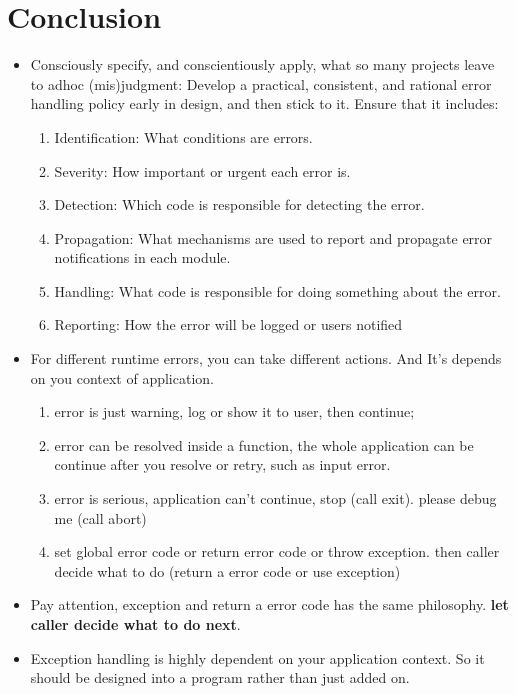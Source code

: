 \documentclass[a4paper,11pt,twoside]{book}
\begin{document}
\section{Conclusion}
\begin{itemize}
	\item  Consciously specify, and conscientiously apply, what so many projects leave to adhoc
	(mis)judgment: Develop a practical, consistent, and rational error handling
	policy early in design, and then stick to it. Ensure that it includes:
	
	\begin{enumerate}
		\item Identification: What conditions are errors.
		\item Severity: How important or urgent each error is.
		\item Detection: Which code is responsible for detecting the error.
		\item Propagation: What mechanisms are used to report and propagate error
		notifications in each module.
		\item Handling: What code is responsible for doing something about the error.
		\item Reporting: How the error will be logged or users notified
	\end{enumerate}
	
	
	\item For different runtime errors, you can take different actions. And It's depends on you context of application.
	\begin{enumerate}
		\item error is just warning, log or show it to user, then continue;
		\item error can be resolved inside a function, the whole application can be continue after you resolve or retry, such as input error.
		\item error is serious, application can't continue, stop (call exit).  please debug me (call abort)
		\item set global error code or return error code or throw exception. then caller decide what to do (return a error code or use exception)
	\end{enumerate}
	
	\item Pay attention, exception and return a error code has the same philosophy. \textbf{let caller decide what to do next}.
	
	\item Exception handling is highly dependent on your application context. So it should be designed into a program rather than just added on.
	

\end{itemize}
\end{document}
